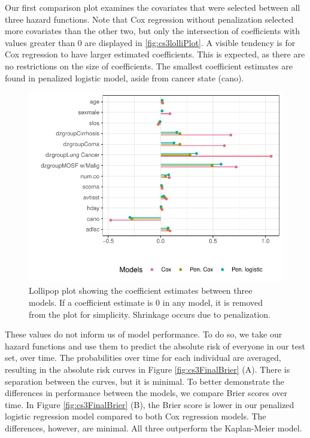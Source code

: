 \documentclass[
]{jss}
\begin{document}
Our first comparison plot examines the covariates that were selected
between all three hazard functions. Note that Cox regression without
penalization selected more covariates than the other two, but only the
intersection of coefficients with values greater than 0 are displayed in
\ref{fig:cs3lolliPlot}. A visible tendency is for Cox regression to have
larger estimated coefficients. This is expected, as there are no
restrictions on the size of coefficients. The smallest coefficient
estimates are found in penalized logistic model, aside from cancer state
(cano).

\begin{CodeChunk}
\begin{figure}

{\centering \includegraphics[width=\textwidth,keepaspectratio=true]{../figures/coefplots-1} 

}

\caption{\label{fig:cs3lolliPlot} Lollipop plot showing the coefficient estimates between three models. If a coefficient estimate is 0 in any model, it is removed from the plot for simplicity. Shrinkage occurs due to penalization.}\label{fig:coefplots}
\end{figure}
\end{CodeChunk}

These values do not inform us of model performance. To do so, we take
our hazard functions and use them to predict the absolute risk of
everyone in our test set, over time. The probabilities over time for
each individual are averaged, resulting in the absolute risk curves in
Figure \ref{fig:cs3FinalBrier} (A). There is separation between the
curves, but it is minimal. To better demonstrate the differences in
performance between the models, we compare Brier scores over time. In
Figure \ref{fig:cs3FinalBrier} (B), the Brier score is lower in our
penalized logistic regression model compared to both Cox regression
models. The differences, however, are minimal. All three outperform the
Kaplan-Meier model.
\end{document}
